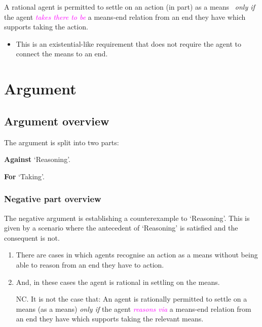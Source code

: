 \documentclass[10pt]{article}
\newenvironment{beamerblock}[1]{%
  \tcolorbox[standard,%
  no shadow,
  noparskip,
  colback=white,
  colframe=black,
  colbacktitle=white,
  coltitle=black,
  colupper=black,
  size=small,
  boxrule=.125mm,
  fonttitle=\bfseries,
  sharp corners=all,
  title=#1]}%
{\endtcolorbox}
\newcommand{\hozlinedash}[0]{%
  \noindent\hdashrule[0.5ex][c]{\textwidth}{.1pt}{2.5pt}
}
\begin{document}
\begin{beamerblock}{Taking}
  A rational agent is permitted to settle on an action (in part) as a means
  \newline
  \mbox{ }\hfill\emph{only if}\hfill\mbox{ }
  \newline
  the agent \textcolor{fuchsia}{\emph{takes there to be}} a means-end relation from an end they have which supports taking the action.
\end{beamerblock}

\begin{itemize}
\item This is an existential-like requirement that does not require the agent to connect the means to an end.
\end{itemize}

\hozlinedash

\newpage

\section{Argument}
\label{sec:argument}

\subsection{Argument overview}
\label{sec:argument-overview}

The argument is split into two parts:
\begin{enumerate*}[label=\roman*., ref=(\roman*)]
\item\label{position:Against} \textbf{Against} `Reasoning'.
\item\label{position:For} \textbf{For} `Taking'.
\end{enumerate*}

\subsubsection{Negative part overview}
\label{sec:negat-part-overv}

The negative argument is establishing a counterexample to `Reasoning'.
This is given by a scenario where the antecedent of `Reasoning' is satisfied and the consequent is not.

\begin{enumerate}[label=N\arabic*., ref=(N\arabic*)]

\item\label{scenarios:exist} There are cases in which agents recognise an action as a means without being able to reason from an end they have to action.

\item\label{scenarios:persmissible} And, in these cases the agent is rational in settling on the means.

\item[NC.]\label{scenario:no-reasoning} It is not the case that:
  An agent is rationally permitted to settle on a means (as a means)  \emph{only if} the agent \textcolor{fuchsia}{\emph{reasons via}} a means-end relation from an end they have which supports taking the relevant means.
\end{enumerate}
\end{document}

